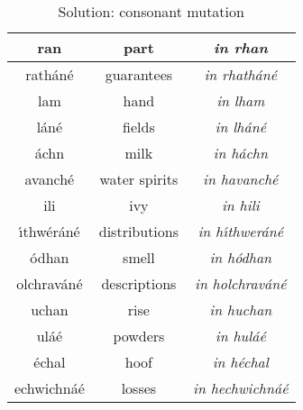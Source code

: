 \begin{table}[H]
{{\begin{tabu}{|c|c|>{\itshape}c|}
      \midrule
      ran & part & in rhan\\
      \midrule
      rath\'{a}n\'{e} & guarantees & in rhath\'{a}n\'{e}\\
      \midrule
      lam & hand & in lham\\
      \midrule
      l\'{a}n\'{e} & fields & in lh\'{a}n\'{e}\\
      \midrule
      \'{a}chn & milk & in h\'{a}chn\\
      \midrule
      avanch\'{e} & water spirits & in havanch\'{e}\\
      \midrule
      ili & ivy & in hili\\
      \midrule
      \'{\i}thw\'{e}r\'{a}n\'{e} & distributions & in h\'{\i}thwer\'{a}n\'{e}\\
      \midrule
      \'{o}dhan & smell & in h\'{o}dhan\\
      \midrule
      olchrav\'{a}n\'{e} & descriptions & in holchrav\'{a}n\'{e}\\
      \midrule
      uchan & rise & in huchan\\
      \midrule
      ul\'{a}\'{e} & powders & in hul\'{a}\'{e}\\
      \midrule
      \'{e}chal & hoof & in h\'{e}chal\\
      \midrule
      echwichn\'{a}\'{e} & losses & in hechwichn\'{a}\'{e}\\
      \bottomrule
    \end{tabu}
  }
}
\label{solution_consonant_mutation}
\caption{Solution: consonant mutation}
\end{table}
